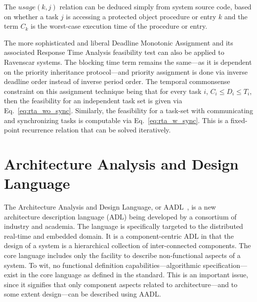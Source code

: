 The $usage(k,j)$ relation can be deduced simply from system source
code, based on whether a task $j$ is accessing a protected object
procedure or entry $k$ and the term $C_k$ is the worst-case execution
time of the procedure or entry.

The more sophisticated and liberal Deadline Monotonic Assignment and
its associated Response Time Analysis feasibility test can also be
applied to Ravenscar systems. The blocking time term remains the
same---as it is dependent on the priority inheritance protocol---and
priority assignment is done via inverse deadline order instead of
inverse period order. The temporal commonsense constraint on this
assignment technique being that for every task $i$, $C_i \le D_i \le
T_i$, then the feasibility for an independent task set is given via
Eq.~\ref{eq:rta_wo_sync}. Similarly, the feasibility for a task-set
with communicating and synchronizing tasks is computable via
Eq.~\ref{eq:rta_w_sync}. This is a fixed-point recurrence relation
that can be solved iteratively.

\section{Architecture Analysis and Design Language}
The Architecture Analysis and Design Language, or AADL~\cite{AS5506},
is a new architecture description language (ADL) being developed by a
consortium of industry and academia. The language is specifically
targeted to the distributed real-time and embedded domain. It is a
component-centric ADL in that the design of a system is a hierarchical
collection of inter-connected components. The core language includes
only the facility to describe non-functional aspects of a system. To
wit, no functional definition capabilities---algorithmic
specification---exist in the core language as defined in the
standard. This is an important issue, since it signifies that only
component aspects related to architecture---and to some extent
design---can be described using AADL.

